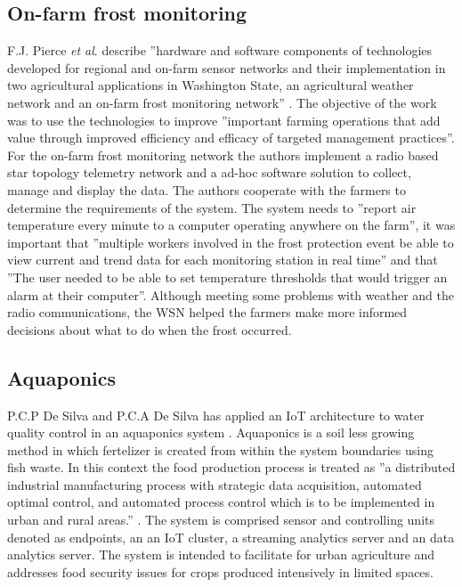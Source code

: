 \documentclass[]{uiophd}
\begin{document}
\subsection{On-farm frost monitoring}
F.J. Pierce \textit{et al}. describe ''hardware and software components of technologies developed for regional and on-farm sensor networks and their implementation in two agricultural applications in Washington State, an agricultural weather network and an on-farm frost monitoring network'' \cite[abstract]{PIERCE200832} . The objective of the work was to use the technologies to improve ''important farming operations that add value through improved efficiency and efficacy of targeted management practices''\cite[abstract]{PIERCE200832}. For the on-farm frost monitoring network the authors implement a radio based star topology telemetry network and a ad-hoc software solution to collect, manage and display the data. The authors cooperate with the farmers to determine the requirements of the system. The system needs to ''report air temperature every minute to a computer operating anywhere on the farm''\cite[p.~35]{PIERCE200832}, it was important that ''multiple workers involved in the frost protection event be able to view current and trend data for each monitoring station in real time''\cite[p.~36]{PIERCE200832} and that ''The user needed to be able to set temperature thresholds that would trigger an alarm at their computer''\cite[p.~36]{PIERCE200832}. Although meeting some problems with weather and the radio communications, the WSN helped the farmers make more informed decisions about what to do when the frost occurred. 

\subsection{Aquaponics}
P.C.P De Silva and P.C.A De Silva has applied an IoT architecture to water quality control in an aquaponics system \cite{desilva}. Aquaponics is a soil less growing method in which fertelizer is created from within the system boundaries using fish waste. In this context the food production process is treated as ''a distributed industrial manufacturing process with strategic data acquisition, automated optimal control, and automated process control which is to be implemented in urban and rural areas.'' \cite[p.~1]{desilva}. The system is comprised sensor and controlling units denoted as endpoints, an an IoT cluster, a  streaming analytics server and an data analytics server. The system is intended to facilitate for urban agriculture and addresses food security issues for crops produced intensively in limited spaces.  
\end{document}
